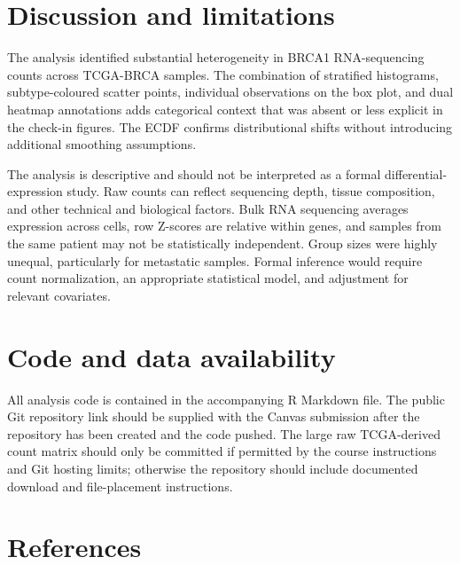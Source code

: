 \documentclass[11pt]{article}
\begin{document}
\section{Discussion and limitations}

The analysis identified substantial heterogeneity in BRCA1 RNA-sequencing counts across TCGA-BRCA samples. The combination of stratified histograms, subtype-coloured scatter points, individual observations on the box plot, and dual heatmap annotations adds categorical context that was absent or less explicit in the check-in figures. The ECDF confirms distributional shifts without introducing additional smoothing assumptions.

The analysis is descriptive and should not be interpreted as a formal differential-expression study. Raw counts can reflect sequencing depth, tissue composition, and other technical and biological factors. Bulk RNA sequencing averages expression across cells, row Z-scores are relative within genes, and samples from the same patient may not be statistically independent. Group sizes were highly unequal, particularly for metastatic samples. Formal inference would require count normalization, an appropriate statistical model, and adjustment for relevant covariates.

\section{Code and data availability}

All analysis code is contained in the accompanying R Markdown file. The public Git repository link should be supplied with the Canvas submission after the repository has been created and the code pushed. The large raw TCGA-derived count matrix should only be committed if permitted by the course instructions and Git hosting limits; otherwise the repository should include documented download and file-placement instructions.

\section{References}
\end{document}
